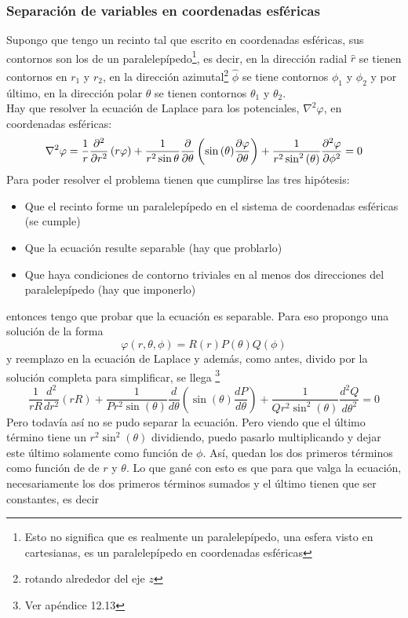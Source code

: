 \subsubsection{Separación de variables en coordenadas esféricas}
Supongo que tengo un recinto tal que escrito en coordenadas esféricas, sus contornos son los de un paralelepípedo\footnote{Esto no significa que es realmente un paralelepípedo, una esfera visto en cartesianas, es un paralelepípedo en coordenadas esféricas}, es decir, en la dirección radial $\hat{r}$ se tienen contornos en $r_{1}$ y $r_{2}$, en la dirección azimutal\footnote{rotando alrededor del eje $z$} $\hat{\phi}$ se tiene contornos $\phi_{1}$ y $\phi_{2}$ y por último, en la dirección polar $\theta$ se tienen contornos $\theta_{1}$ y $\theta_{2}$.\\
\indent Hay que resolver la ecuación de Laplace para los potenciales, $\nabla^{2}\varphi$, en coordenadas esféricas:
\begin{equation*}
    \nabla^{2} \varphi = 
    \frac{1}{r}\frac{\partial^{2}}{\partial r^{2}} \left( r\varphi \right) + \frac{1}{r^{2}\sin{\theta}} \frac{\partial}{\partial \theta} \left( \sin{(\theta)} \frac{\partial \varphi}{\partial \theta} \right) + \frac{1}{r^{2}\sin^{2}{(\theta)}} \frac{\partial^{2} \varphi}{\partial \phi^{2}}
    = 0
\end{equation*}
Para poder resolver el problema tienen que cumplirse las tres hipótesis:
\begin{itemize}
    \item Que el recinto forme un paralelepípedo en el sistema de coordenadas esféricas (se cumple)
    \item Que la ecuación resulte separable (hay que problarlo) 
    \item Que haya condiciones de contorno triviales en al menos dos direcciones del paralelepípedo (hay que imponerlo)
\end{itemize}
entonces tengo que probar que la ecuación es separable. Para eso propongo una solución de la forma
\begin{equation*}
    \varphi(r,\theta,\phi) = R(r)P(\theta)Q(\phi)
\end{equation*}
y reemplazo en la ecuación de Laplace y además, como antes, divido por la solución completa para simplificar, se llega \footnote{Ver apéndice 12.13}
\begin{equation*}
    \frac{1}{rR}
    \frac{d^{2}}{dr^{2}}(rR)
    +
    \frac{1}{Pr^{2}\sin{(\theta)}}
    \frac{d}{d\theta}
    \left(
        \sin{(\theta)}\frac{dP}{d\theta}
    \right)
    +
    \frac{1}{Qr^{2}\sin^{2}{(\theta)}}
    \frac{d^{2}Q}{d\theta^{2}}
    = 0
\end{equation*}
Pero todavía así no se pudo separar la ecuación. Pero viendo que el último término tiene un $r^{2}\sin^{2}{(\theta)}$ dividiendo, puedo pasarlo multiplicando y dejar este último solamente como función de $\phi$. Así, quedan los dos primeros términos como función de de $r$ y $\theta$. Lo que gané con esto es que para que valga la ecuación, necesariamente los dos primeros términos sumados y el último tienen que ser constantes, es decir
